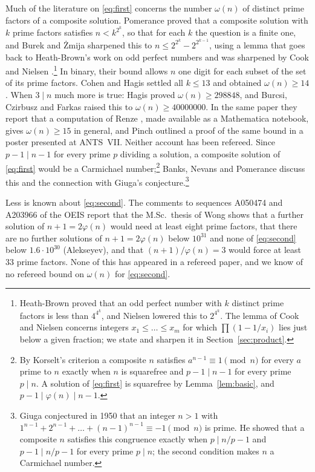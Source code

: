 \documentclass[11pt,reqno]{amsart}
\numberwithin{equation}{section}
\theoremstyle{plain}
\theoremstyle{definition}
\theoremstyle{remark}
\begin{document}
Much of the literature on \eqref{eq:first} concerns the number
$\omega(n)$ of distinct prime factors of a composite solution.
Pomerance \cite{Pom77} proved that a composite solution with $k$ prime
factors satisfies $n<k^{2^k}$, so that for each $k$ the question is a
finite one, and Burek and \.Zmija \cite{BZ19} sharpened this to
$n\le2^{2^k}-2^{2^{k-1}}$, using a lemma that goes back to
Heath-Brown's work on odd perfect numbers \cite{HB94} and was
sharpened by Cook \cite{Coo99} and Nielsen \cite{Nie03}.\footnote{Heath-Brown
proved that an odd perfect number with $k$ distinct prime factors is
less than $4^{4^k}$, and Nielsen lowered this to $2^{4^k}$. The lemma
of Cook and Nielsen concerns integers $x_1\le\dots\le x_m$ for which
$\prod(1-1/x_i)$ lies just below a given fraction; we state and
sharpen it in Section~\ref{sec:product}.} In binary,
their bound allows $n$ one digit for each subset of the set of its
prime factors. Cohen and Hagis \cite{CH80} settled all $k\le13$ and
obtained $\omega(n)\ge14$. When $3\mid n$ much more is true: Hagis
\cite{Hag88} proved $\omega(n)\ge298848$, and Burcsi, Czirbusz and
Farkas \cite{BCF11} raised this to $\omega(n)\ge40000000$. In the same
paper they report that a computation of Renze \cite{Ren04}, made
available as a Mathematica notebook, gives $\omega(n)\ge15$ in general,
and Pinch \cite{Pin06} outlined a proof of the same bound in a poster
presented at ANTS~VII. Neither account has been refereed. Since $p-1\mid n-1$ for every prime
$p$ dividing a solution, a composite solution of \eqref{eq:first}
would be a Carmichael number;\footnote{By Korselt's criterion a
composite $n$ satisfies $a^{n-1}\equiv1\pmod n$ for every $a$ prime to
$n$ exactly when $n$ is squarefree and $p-1\mid n-1$ for every prime
$p\mid n$. A solution of \eqref{eq:first} is squarefree by
Lemma~\ref{lem:basic}, and $p-1\mid\varphi(n)\mid n-1$.} Banks, Nevans and Pomerance \cite{BNP09}
discuss this and the connection with Giuga's conjecture.\footnote{Giuga
conjectured in 1950 that an integer $n>1$ with
$1^{n-1}+2^{n-1}+\dots+(n-1)^{n-1}\equiv-1\pmod n$ is prime. He showed
that a composite $n$ satisfies this congruence exactly when
$p\mid n/p-1$ and $p-1\mid n/p-1$ for every prime $p\mid n$; the second
condition makes $n$ a Carmichael number.}

Less is known about \eqref{eq:second}. The comments to
sequences A050474 and A203966 of the OEIS \cite{OEIS} report that the
M.Sc.\ thesis of Wong \cite{Won97} shows that a further solution of
$n+1=2\varphi(n)$ would need at least eight prime factors, that there
are no further solutions of $n+1=2\varphi(n)$ below $10^{31}$ and none
of \eqref{eq:second} below $1.6\cdot10^{30}$ (Alekseyev), and that
$(n+1)/\varphi(n)=3$ would force at least $33$ prime factors. None of
this has appeared in a refereed paper, and we know of no refereed bound
on $\omega(n)$ for \eqref{eq:second}.
\end{document}
